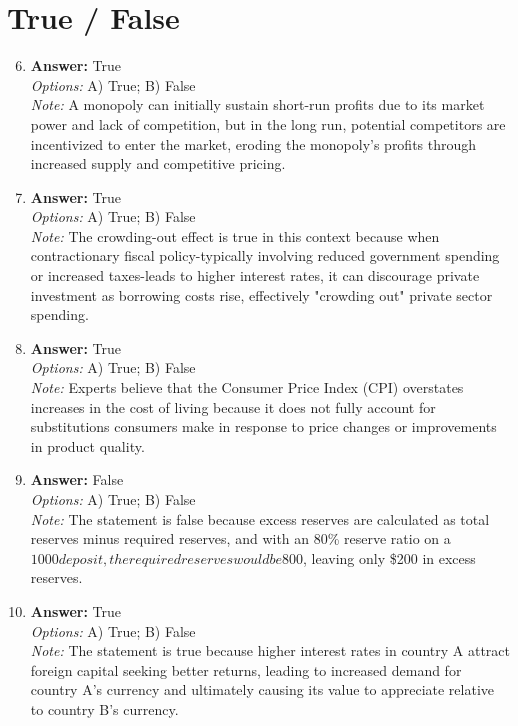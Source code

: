 \documentclass[12pt]{article}
\begin{document}
\section*{True / False}
\begin{enumerate}[label=\arabic*.]
\setcounter{enumi}{5}
\item \textbf{Answer:} True
\\ \textit{Options:} A) True; B) False
\\ \textit{Note:} A monopoly can initially sustain short-run profits due to its market power and lack of competition, but in the long run, potential competitors are incentivized to enter the market, eroding the monopoly's profits through increased supply and competitive pricing.
\item \textbf{Answer:} True
\\ \textit{Options:} A) True; B) False
\\ \textit{Note:} The crowding-out effect is true in this context because when contractionary fiscal policy-typically involving reduced government spending or increased taxes-leads to higher interest rates, it can discourage private investment as borrowing costs rise, effectively "crowding out" private sector spending.
\item \textbf{Answer:} True
\\ \textit{Options:} A) True; B) False
\\ \textit{Note:} Experts believe that the Consumer Price Index (CPI) overstates increases in the cost of living because it does not fully account for substitutions consumers make in response to price changes or improvements in product quality.
\item \textbf{Answer:} False
\\ \textit{Options:} A) True; B) False
\\ \textit{Note:} The statement is false because excess reserves are calculated as total reserves minus required reserves, and with an 80\% reserve ratio on a $1000 deposit, the required reserves would be $800, leaving only \$200 in excess reserves.
\item \textbf{Answer:} True
\\ \textit{Options:} A) True; B) False
\\ \textit{Note:} The statement is true because higher interest rates in country A attract foreign capital seeking better returns, leading to increased demand for country A's currency and ultimately causing its value to appreciate relative to country B's currency.
\end{enumerate}
\end{document}

